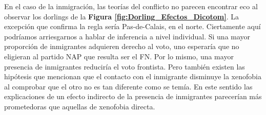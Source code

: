 En el caso de la inmigración, las teorías del conflicto no parecen encontrar eco al observar los dorlings de la \textbf{Figura \ref{fig:Dorling_Efectos_Dicotom}}. La excepción que confirma la regla sería Pas-de-Calais, en el norte. Ciertamente aquí podríamos arriesgarnos a hablar de inferencia a nivel individual. Si una mayor proporción de inmigrantes adquieren derecho al voto, uno esperaría que no eligieran al partido NAP que resulta ser el FN. Por lo mismo, una mayor presencia de inmigrantes reduciría el voto frontista. Pero también existen las hipótesis que mencionan que el contacto con el inmigrante disminuye la xenofobia al comprobar que el otro no es tan diferente como se temía. En este sentido las explicaciones de un efecto indirecto de la presencia de inmigrantes parecerían más prometedoras que aquellas de xenofobia directa.\\ 

